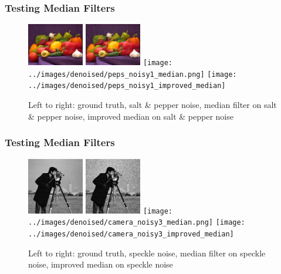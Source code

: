 \documentclass{beamer}
\begin{document}
\begin{frame}
  \frametitle{Testing Median Filters}
\begin{figure}
    \centering
  \includegraphics[width =
    0.22\textwidth]{../images/peps_truth.png}
    \includegraphics[width =
    0.22\textwidth]{../images/peps_noisy1.png}
    \texttt{[image: ../images/denoised/peps\_noisy1\_median.png]}
    \texttt{[image: ../images/denoised/peps\_noisy1\_improved\_median]}
    \caption{Left to right: ground truth, salt \& pepper noise, median
      filter on salt \& pepper noise, improved median on salt \&
      pepper noise }
  \end{figure}
\end{frame}

\begin{frame}
  \frametitle{Testing Median Filters}
\begin{figure}
    \centering
  \includegraphics[width =
    0.22\textwidth]{../images/camera_truth.png}
    \includegraphics[width =
    0.22\textwidth]{../images/camera_noisy3.png}
    \texttt{[image: ../images/denoised/camera\_noisy3\_median.png]}
    \texttt{[image: ../images/denoised/camera\_noisy3\_improved\_median]}
    \caption{Left to right: ground truth, speckle noise, median
      filter on speckle noise, improved median on speckle noise }
  \end{figure}
\end{frame}
\end{document}
